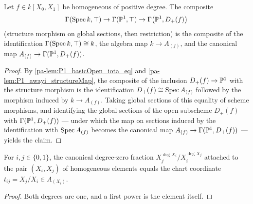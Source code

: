 \begin{lemma}
  \label{pa-lem:P1_structureMap_appTop_awayToSection}
  \leanok

  Let \(f \in k[X_0, X_1]\) be homogeneous of positive degree. The composite
  \[
    \Gamma(\operatorname{Spec} k, \top) \to \Gamma(\mathbb{P}^1, \top) \to \Gamma\bigl(\mathbb{P}^1, D_+(f)\bigr)
  \]
  (structure morphism on global sections, then restriction) is the composite of the
  identification \(\Gamma(\operatorname{Spec} k, \top) \cong k\), the algebra map \(k \to A_{(f)}\), and
  the canonical map \(A_{(f)} \to \Gamma(\mathbb{P}^1, D_+(f))\).
\end{lemma}
\begin{proof}
  \leanok
  By \ref{pa-lem:P1_basicOpen_iota_eq} and \ref{pa-lem:P1_awayi_structureMap}, the composite of
  the inclusion \(D_+(f) \to \mathbb{P}^1\) with the structure morphism is the identification
  \(D_+(f) \cong \operatorname{Spec} A_{(f)}\) followed by the morphism induced by \(k \to A_{(f)}\).
  Taking global sections of this equality of scheme morphisms, and identifying the global
  sections of the open subscheme \(D_+(f)\) with \(\Gamma(\mathbb{P}^1, D_+(f))\) --- under which
  the map on sections induced by the identification with \(\operatorname{Spec} A_{(f)}\) becomes the
  canonical map \(A_{(f)} \to \Gamma(\mathbb{P}^1, D_+(f))\) --- yields the claim.
\end{proof}

\begin{lemma}
  \label{pa-lem:P1_isLocalizationElem_X_eq}
  \leanok

  For \(i, j \in \{0,1\}\), the canonical degree-zero fraction
  \(X_j^{\deg X_i} / X_i^{\deg X_j}\) attached to the pair \((X_i, X_j)\) of homogeneous
  elements equals the chart coordinate \(t_{ij} = X_j / X_i \in A_{(X_i)}\).
\end{lemma}
\begin{proof}
  \leanok
  Both degrees are one, and a first power is the element itself.
\end{proof}

